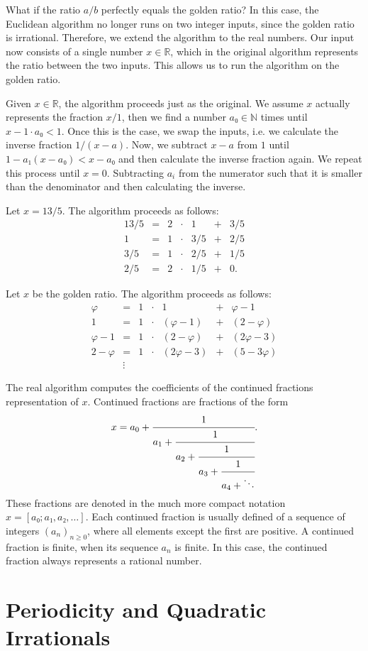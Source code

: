 What if the ratio $a/b$ perfectly equals the golden ratio?
In this case, the Euclidean algorithm no longer runs on two integer inputs,
since the golden ratio is irrational.
Therefore, we extend the algorithm to the real numbers.
Our input now consists of a single number $x ∈ ℝ$, which in the original
algorithm represents the ratio between the two inputs.
This allows us to run the algorithm on the golden ratio.

Given $x ∈ ℝ$, the algorithm proceeds just as the original.
We assume $x$ actually represents the fraction $x/1$,
then we find a number $a₀ ∈ ℕ$ times until $x - 1 · a₀ < 1$.
Once this is the case, we swap the inputs, i.e. we calculate the inverse fraction $1/(x - a)$.
Now, we subtract $x - a$ from $1$ until $1 - a₁ (x - a₀) < x - a₀$
and then calculate the inverse fraction again.
We repeat this process until $x = 0$.
Subtracting $a_i$ from the numerator such that it is smaller than the
denominator and then calculating the inverse.

\begin{example}
  Let $x = 13/5$.
  The algorithm proceeds as follows:
  \[
    \begin{array}{rclcrcl}
      13/5 & = & 2 & · & 1   & + & 3/5 \\
         1 & = & 1 & · & 3/5 & + & 2/5 \\
       3/5 & = & 1 & · & 2/5 & + & 1/5 \\
       2/5 & = & 2 & · & 1/5 & + & 0.
    \end{array}
  \]
\end{example}

\begin{example}
  Let $x$ be the golden ratio.
  The algorithm proceeds as follows:
  \[
    \begin{array}{rclcrcl}
      φ & = & 1 & · & 1   & + & φ - 1 \\
         1 & = & 1 & · & (φ - 1) & + & (2 - φ) \\
       φ - 1 & = & 1 & · & (2 - φ) & + & (2φ - 3) \\
       2 - φ & = & 1 & · & (2φ - 3) & + & (5 - 3φ) \\
       & \vdots &
    \end{array}
  \]
\end{example}


The real algorithm computes the coefficients of the continued fractions representation of $x$.
Continued fractions are fractions of the form
\[
  x = a_0 + \cfrac{1}{a_1 + \cfrac{1}{a_2 + \cfrac{1}{a_3 + \cfrac{1}{a_4 + \ddots}}}}.
\]
These fractions are denoted in the much more compact notation $x = [a₀; a₁, a₂, …]$.
Each continued fraction is usually defined of a sequence of integers $(a_n)_{n ≥ 0}$,
where all elements except the first are positive.
A continued fraction is finite, when its sequence $a_n$ is finite.
In this case, the continued fraction always represents a rational number.

\section{Periodicity and Quadratic Irrationals}
